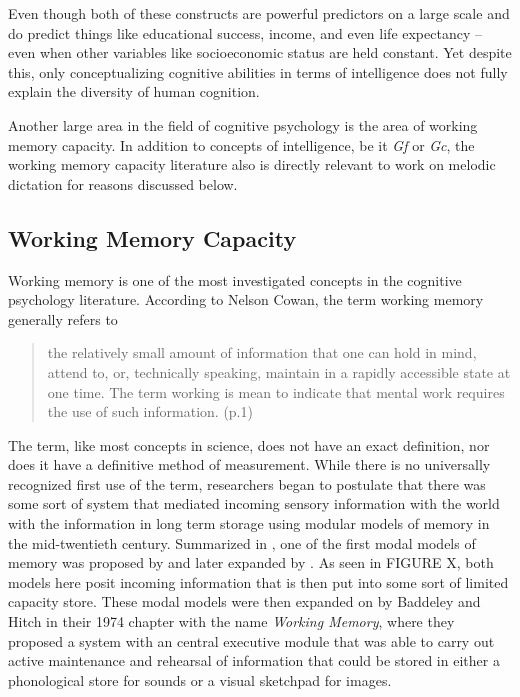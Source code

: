 \documentclass[]{book}
\theoremstyle{definition}
\theoremstyle{definition}
\theoremstyle{definition}
\theoremstyle{remark}
\begin{document}
Even though both of these constructs are powerful predictors on a large
scale and do predict things like educational success, income, and even
life expectancy \citep{ritchieIntelligenceAllThat2015}-- even when other
variables like socioeconomic status are held constant. Yet despite this,
only conceptualizing cognitive abilities in terms of intelligence does
not fully explain the diversity of human cognition.

Another large area in the field of cognitive psychology is the area of
working memory capacity. In addition to concepts of intelligence, be it
\emph{Gf} or \emph{Gc}, the working memory capacity literature also is
directly relevant to work on melodic dictation for reasons discussed
below.

\hypertarget{working-memory-capacity}{%
\subsection{Working Memory Capacity}\label{working-memory-capacity}}

Working memory is one of the most investigated concepts in the cognitive
psychology literature. According to Nelson Cowan, the term working
memory generally refers to

\begin{quote}
the relatively small amount of information that one can hold in mind,
attend to, or, technically speaking, maintain in a rapidly accessible
state at one time. The term working is mean to indicate that mental work
requires the use of such information. (p.1)
\citep{cowanWorkingMemoryCapacity2005}
\end{quote}

The term, like most concepts in science, does not have an exact
definition, nor does it have a definitive method of measurement. While
there is no universally recognized first use of the term, researchers
began to postulate that there was some sort of system that mediated
incoming sensory information with the world with the information in long
term storage using modular models of memory in the mid-twentieth
century. Summarized in \citep{cowanWorkingMemoryCapacity2005}, one of
the first modal models of memory was proposed by
\citep{broadbentPerceptionCommunication1958} and later expanded by
\citep{atkinsonHUMANMEMORYPROPOSED1968}. As seen in FIGURE X, both
models here posit incoming information that is then put into some sort
of limited capacity store. These modal models were then expanded on by
Baddeley and Hitch \citep{baddeleyWorkingMemory1974} in their 1974
chapter with the name \emph{Working Memory}, where they proposed a
system with an central executive module that was able to carry out
active maintenance and rehearsal of information that could be stored in
either a phonological store for sounds or a visual sketchpad for images.
\end{document}
